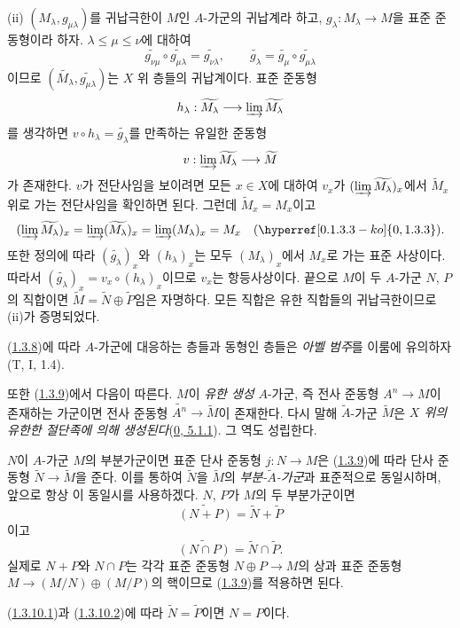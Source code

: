 (ii) $(M_\lambda,g_{\mu\lambda})$를 귀납극한이 $M$인 $A$-가군의
귀납계라 하고, $g_\lambda:M_\lambda\to M$을 표준 준동형이라 하자.
$\lambda\leq\mu\leq\nu$에 대하여
\[
  \widetilde{g_{\nu\mu}}\circ\widetilde{g_{\mu\lambda}}
  =\widetilde{g_{\nu\lambda}},
  \qquad
  \widetilde{g_\lambda}=\widetilde{g_\mu}\circ
  \widetilde{g_{\mu\lambda}}
\]
이므로 $(\widetilde{M_\lambda},\widetilde{g_{\mu\lambda}})$는
$X$ 위 층들의 귀납계이다. 표준 준동형
\[
  h_\lambda:\widetilde{M_\lambda}\longrightarrow
  \varinjlim\widetilde{M_\lambda}
\]
를 생각하면
$v\circ h_\lambda=\widetilde{g_\lambda}$를 만족하는 유일한 준동형
\[
  v:\varinjlim\widetilde{M_\lambda}\longrightarrow\widetilde{M}
\]
가 존재한다. $v$가 전단사임을 보이려면 모든 $x\in X$에 대하여
$v_x$가 $(\varinjlim\widetilde{M_\lambda})_x$에서
$\widetilde{M}_x$ 위로 가는 전단사임을 확인하면 된다. 그런데
$\widetilde{M}_x=M_x$이고
\[
  (\varinjlim\widetilde{M_\lambda})_x
  =\varinjlim(\widetilde{M_\lambda})_x
  =\varinjlim(M_\lambda)_x=M_x
  \quad(\hyperref[0.1.3.3-ko]{0, 1.3.3}).
\]
또한 정의에 따라 $(\widetilde{g_\lambda})_x$와 $(h_\lambda)_x$는
모두 $(M_\lambda)_x$에서 $M_x$로 가는 표준 사상이다. 따라서
$(\widetilde{g_\lambda})_x=v_x\circ(h_\lambda)_x$이므로 $v_x$는
항등사상이다.
끝으로 $M$이 두 $A$-가군 $N$, $P$의 직합이면
$\widetilde{M}=\widetilde{N}\oplus\widetilde{P}$임은 자명하다. 모든
직합은 유한 직합들의 귀납극한이므로 (ii)가 증명되었다.

(\hyperref[I.1.3.8-ko]{1.3.8})에 따라 $A$-가군에 대응하는 층들과
동형인 층들은 \emph{아벨 범주}를 이룸에 유의하자(T, I, 1.4).

또한 (\hyperref[I.1.3.9-ko]{1.3.9})에서 다음이 따른다. $M$이
\emph{유한 생성} $A$-가군, 즉 전사 준동형 $A^n\to M$이 존재하는
가군이면 전사 준동형
$\widetilde{A^n}\to\widetilde{M}$이 존재한다. 다시 말해
$\widetilde{A}$-가군 $\widetilde{M}$은 \emph{$X$ 위의 유한한
절단족에 의해 생성된다}(\hyperref[0.5.1.1-ko]{0, 5.1.1}). 그 역도
성립한다.

\begin{env}[1.3.10]
\label{I.1.3.10-ko}
$N$이 $A$-가군 $M$의 부분가군이면 표준 단사 준동형 $j:N\to M$은
(\hyperref[I.1.3.9-ko]{1.3.9})에 따라 단사 준동형
$\widetilde{N}\to\widetilde{M}$을 준다. 이를 통하여
$\widetilde{N}$을 $\widetilde{M}$의
\emph{부분-$\widetilde{A}$-가군}과 표준적으로 동일시하며, 앞으로
항상 이 동일시를 사용하겠다. $N$, $P$가 $M$의 두 부분가군이면
\begin{equation}
  \widetilde{(N+P)}=\widetilde{N}+\widetilde{P}
  \tag{1.3.10.1}\label{I.1.3.10.1-ko}
\end{equation}
이고
\begin{equation}
  \widetilde{(N\cap P)}=\widetilde{N}\cap\widetilde{P}.
  \tag{1.3.10.2}\label{I.1.3.10.2-ko}
\end{equation}
실제로 $N+P$와 $N\cap P$는 각각 표준 준동형
$N\oplus P\to M$의 상과 표준 준동형
$M\to(M/N)\oplus(M/P)$의 핵이므로
(\hyperref[I.1.3.9-ko]{1.3.9})를 적용하면 된다.

(\hyperref[I.1.3.10.1-ko]{1.3.10.1})과
(\hyperref[I.1.3.10.2-ko]{1.3.10.2})에 따라
$\widetilde{N}=\widetilde{P}$이면 $N=P$이다.
\end{env}

